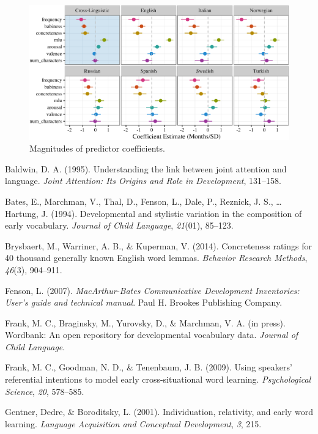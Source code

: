 \documentclass[10pt, letterpaper]{article}
\newenvironment{CodeChunk}{}{}
\begin{document}
\begin{CodeChunk}
\begin{figure}[tb]

{\centering \includegraphics{figs/coefs2-1} 

}

\caption[Magnitudes of predictor coefficients]{Magnitudes of predictor coefficients.}\label{fig:coefs2}
\end{figure}
\end{CodeChunk}

Baldwin, D. A. (1995). Understanding the link between joint attention
and language. \emph{Joint Attention: Its Origins and Role in
Development}, 131--158.

Bates, E., Marchman, V., Thal, D., Fenson, L., Dale, P., Reznick, J. S.,
\ldots{} Hartung, J. (1994). Developmental and stylistic variation in
the composition of early vocabulary. \emph{Journal of Child Language},
\emph{21}(01), 85--123.

Brysbaert, M., Warriner, A. B., \& Kuperman, V. (2014). Concreteness
ratings for 40 thousand generally known English word lemmas.
\emph{Behavior Research Methods}, \emph{46}(3), 904--911.

Fenson, L. (2007). \emph{MacArthur-Bates Communicative Development
Inventories: User's guide and technical manual}. Paul H. Brookes
Publishing Company.

Frank, M. C., Braginsky, M., Yurovsky, D., \& Marchman, V. A. (in
press). Wordbank: An open repository for developmental vocabulary data.
\emph{Journal of Child Language}.

Frank, M. C., Goodman, N. D., \& Tenenbaum, J. B. (2009). Using
speakers' referential intentions to model early cross-situational word
learning. \emph{Psychological Science}, \emph{20}, 578--585.

Gentner, Dedre, \& Boroditsky, L. (2001). Individuation, relativity, and
early word learning. \emph{Language Acquisition and Conceptual
Development}, \emph{3}, 215.
\end{document}
